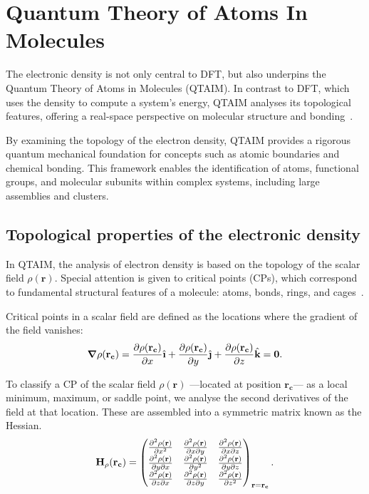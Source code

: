 \newpage
\section{Quantum Theory of Atoms In Molecules}

The electronic density is not only central to \gls{DFT}, but also underpins the
Quantum Theory of Atoms in Molecules (\gls{QTAIM}). In contrast to \gls{DFT},
which uses the density to compute a system's energy, QTAIM analyses its
topological features, offering a real-space perspective on molecular structure
and bonding~\cite{bader}.

By examining the topology of the electron density, \gls{QTAIM} provides a
rigorous quantum mechanical foundation for concepts such as atomic boundaries
and chemical bonding. This framework enables the identification
of atoms, functional groups, and molecular subunits within complex systems,
including large assemblies and clusters.

\subsection{Topological properties of the electronic density}

In \gls{QTAIM}, the analysis of electron density is based on the topology of the
scalar field $\rho(\mathbf{r})$. Special attention is given to critical points
(\glspl{CP}), which correspond to fundamental structural features of a molecule:
atoms, bonds, rings, and cages~\cite{bader, coppens, matta}.

Critical points in a scalar field are defined as the locations where the gradient
of the field vanishes:
%
\begin{align}
  \nnabla\rho(\mathbf{r_c})= \pdv{\rho(\mathbf{r_c})}{x}\hat{\textbf{\i}} +
  \pdv{\rho(\mathbf{r_c})}{y}\hat{\textbf{\j}} +
  \pdv{\rho(\mathbf{r_c})}{z}\hat{\textbf{k}} = \mathbf{0} .
\end{align}

To classify a \gls{CP} of the scalar field $\rho(\mathbf{r})$ ---located
at position $\mathbf{r_c}$--- as a local minimum, maximum, or saddle point, we
analyse the second derivatives of the field at that location. These are
assembled into a symmetric matrix known as the Hessian.
%
\begin{align}
  \mathbf{H}_\rho(\mathbf{r_c}) =
  \begin{pmatrix}
    \pdv[2]{\rho(\mathbf{r})}{x} & \pdv[2]{\rho(\mathbf{r})}{x}{y} & \pdv[2]{\rho(\mathbf{r})}{x}{z} \\
    \pdv[2]{\rho(\mathbf{r})}{y}{x} & \pdv[2]{\rho(\mathbf{r})}{y} & \pdv[2]{\rho(\mathbf{r})}{y}{z} \\
    \pdv[2]{\rho(\mathbf{r})}{z}{x} & \pdv[2]{\rho(\mathbf{r})}{z}{y} & \pdv[2]{\rho(\mathbf{r})}{z}
  \end{pmatrix}_{\mathbf{r=r_c}} .
\end{align}

